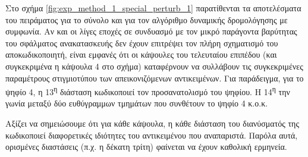 Στο σχήμα \ref{fig:exp_method_1_special_perturb_1} παρατίθενται τα αποτελέσματα του πειράματος για το σύνολο  και για τον αλγόριθμο δυναμικής δρομολόγησης με συμφωνία. Αν και οι λίγες εποχές σε συνδυασμό με τον μικρό παράγοντα βαρύτητας του σφάλματος ανακατασκευής δεν έχουν επιτρέψει τον πλήρη σχηματισμό του αποκωδικοποιητή, είναι εμφανές ότι οι κάψουλες του τελευταίου επιπέδου (και συγκεκριμένα η κάψουλα 4 στο σχήμα) καταφέρνουν να συλλάβουν τις συγκεκριμένες παραμέτρους στιγμιοτύπου των απεικονιζόμενων αντικειμένων. Για παράδειγμα, για το ψηφίο 4, η 13\textsuperscript{η} διάσταση κωδικοποιεί τον προσανατολισμό του ψηφίου. Η 14\textsuperscript{η} την γωνία μεταξύ δύο ευθύγραμμων τμημάτων που συνθέτουν το ψηφίο 4 κ.ο.κ.\par


Αξίζει να σημειώσουμε ότι για κάθε κάψουλα, η κάθε διάσταση του διανύσματός της κωδικοποιεί διαφορετικές ιδιότητες του αντικειμένου που αναπαριστά. Παρόλα αυτά, ορισμένες διαστάσεις (π.χ. η δέκατη τρίτη) φαίνεται να έχουν καθολική ερμηνεία.\par

